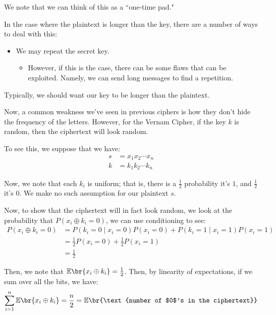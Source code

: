 \documentclass[openany]{book}
\begin{document}
We note that we can think of this as a ``one-time pad." 
\begin{rmk}
	In the case where the plaintext is longer than the key, there are a number of ways to deal with this:
	\begin{itemize}
		\item We may repeat the secret key.
		\begin{itemize}
			\item However, if this is the case, there can be some flaws that can be exploited. Namely, we can send long messages to find a repetition.
		\end{itemize}
	\end{itemize}
	
	Typically, we should want our key to be longer than the plaintext.
\end{rmk}

Now, a common weakness we've seen in previous ciphers is how they don't hide the frequency of the letters. However, for the Vernam Cipher, if the key $k$ is random, then the ciphertext will look random.

To see this, we suppose that we have:
\begin{align*}
	s &= x_1 x_2 \cdots x_n \\
	k &= k_1 k_2 \cdots k_n
\end{align*}

Now, we note that each $k_i$ is uniform; that is, there is a $\frac{1}{2}$ probability it's $1$, and $\frac{1}{2}$ it's $0$. We make no such assumption for our plaintext $s$.

Now, to show that the ciphertext will in fact look random, we look at the probability that $P(x_i \oplus k_i = 0)$, we can use conditioning to see:
\begin{align*}
	P(x_i \oplus k_i = 0) &= P(k_i = 0 \mid x_i = 0)P(x_i = 0) + P(k_i = 1 \mid x_i = 1)P(x_i = 1) \\
	&= \frac 1 2 P(x_i = 0) + \frac 1 2 P(x_i = 1) \\
	&= \frac{1}{2}
\end{align*}

Then, we note that $\mathbb E \br{x_i \oplus k_i} = \frac{1}{2}$. Then, by linearity of expectations, if we sum over all the bits, we have:
\begin{equation*}
	\sum_{i=1}^{n} \mathbb E\br{x_i \oplus k_i} = \frac n 2 = \mathbb E\br{\text{number of $0$'s in the ciphertext}}
\end{equation*}
\end{document}
